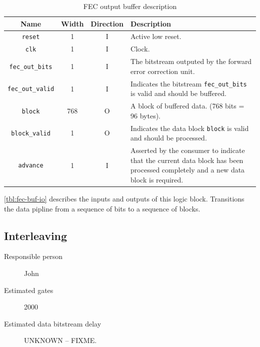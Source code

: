 \documentclass[dvips,10pt,twocolumn]{article}
\newcommand{\wire}{\texttt}
\begin{document}
\begin{table} \begin{tabularx}{\linewidth}{c|c|c|X}
	\label{tbl:fec-buf-io}
	Name & Width & Direction & Description \\ \hline

	\wire{reset} & 1 & I & Active low reset. \\

	\wire{clk} & 1 & I & Clock. \\

	\wire{fec\_out\_bits} & 1 & I & The bitstream outputed by the
	forward error correction unit. \\

	\wire{fec\_out\_valid} & 1 & I & Indicates the bitstream
	\wire{fec\_out\_bits} is valid and should be buffered. \\


	\wire{block} & 768 & O & A block of buffered data. (768 bits = 96
	bytes). \\

	\wire{block\_valid} & 1 & O & Indicates the data block
	\wire{block} is valid and should be processed. \\

	\wire{advance} & 1 & I & Asserted by the consumer to indicate that
	the current data block has been processed completely and a new data
	block is required. \\

\end{tabularx} \caption{FEC output buffer description} \end{table}

\autoref{tbl:fec-buf-io} describes the inputs and outputs of this logic
block.
Transitions the data pipline from a sequence of bits to a sequence of
blocks.


\subsection{Interleaving}
\label{sec:interleaving}
\begin{description}
	\item[Responsible person] John
	\item[Estimated gates] 2000
	\item[Estimated data bitstream delay] UNKNOWN -- FIXME.
\end{description}
	
\end{document}
